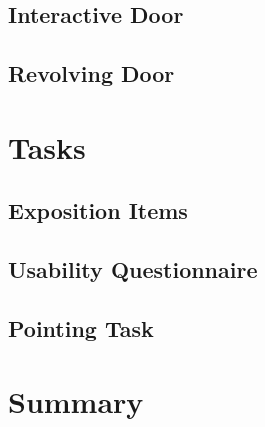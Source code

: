 \subsection{Interactive Door}
\label{sec:interactive-door}

\subsection{Revolving Door}
\label{sec:rev-door}

\section{Tasks}
\label{sec:tasks}

\subsection{Exposition Items}
\label{sec:expo-items}

\subsection{Usability Questionnaire}
\label{sec:questionnaire}

\subsection{Pointing Task}
\label{sec:pointing-task}

\section{Summary}
\label{sec:summary}